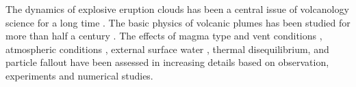 \documentclass[journal abbreviation, manuscript]{copernicus}
\begin{document}
The dynamics of explosive eruption clouds has been a central issue of volcanology science for a long time \citep{settle1978volcanic, wilson1978control}.
The basic physics of volcanic plumes has been studied for more than half a century \citep{morton1956turbulent, settle1978volcanic, wilson1978control}. The effects of magma type and vent conditions \citep{woods1988fluid, woods1995decompression}, atmospheric conditions \citep{ woods1993moist, sparks1997volcanic, bursik2001effect}, external surface water \citep{koyaguchi1996formation}, thermal disequilibrium, and particle fallout \citep{woods1991particle} have been assessed in increasing details based on observation, experiments and numerical studies.
%
%
%
\end{document}
